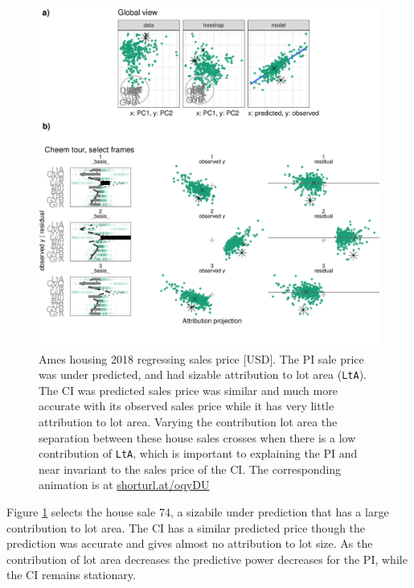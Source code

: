 \documentclass[
]{article}
\begin{document}
\begin{figure}

{\centering \includegraphics[width=1\linewidth]{./figures/case_ames2018} 

}

\caption{Ames housing 2018 regressing sales price {[}USD{]}. The PI sale price was under predicted, and had sizable attribution to lot area (\texttt{LtA}). The CI was predicted sales price was similar and much more accurate with its observed sales price while it has very little attribution to lot area. Varying the contribution lot area the separation between these house sales crosses when there is a low contribution of \texttt{LtA}, which is important to explaining the PI and near invariant to the sales price of the CI. The corresponding animation is at \href{https://github.com/nspyrison/cheem_paper/blob/main/figures/case_ames2018.mp4}{shorturl.at/oqyDU}}\label{fig:caseames}
\end{figure}

Figure \ref{fig:caseames} selects the house sale 74, a sizabile under prediction that has a large contribution to lot area. The CI has a similar predicted price though the prediction was accurate and gives almost no attribution to lot size. As the contribution of lot area decreases the predictive power decreases for the PI, while the CI remains stationary.
\end{document}

